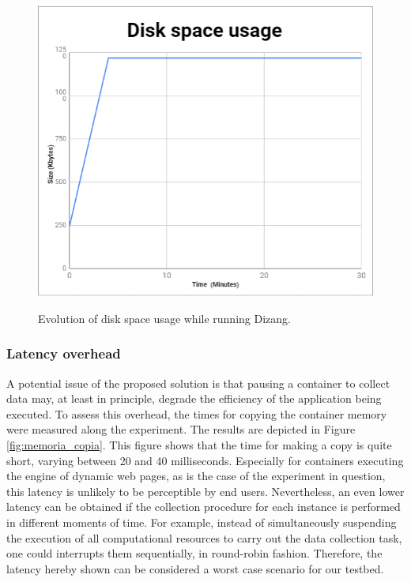 \documentclass[conference]{IEEEtran}
\newcommand{\fancyname}{Dizang}
\begin{document}
\begin{figure}[htb!]
\footnotesize
\caption{Evolution of disk space usage while running \fancyname.}
\includegraphics[scale=0.55]{evolucao_coleta_ieee.png}
\centering
\label{fig:evolucao_coleta}
\end{figure}


\subsubsection{Latency overhead}
A potential issue of the proposed solution is that pausing a container to collect data may, at least in principle, degrade the efficiency of the application being executed.
%
To assess this overhead, the times for copying the container memory were measured along the experiment.
%
The results are depicted in Figure \ref{fig:memoria_copia}.
%
This figure shows that the time for making a copy is quite short, varying between 20 and 40 milliseconds. 
%
Especially for containers executing the engine of dynamic web pages, as is the case of the experiment in question, this latency is unlikely to be perceptible by end users.
%
Nevertheless, an even lower latency can be obtained if the collection procedure for each instance is performed in different moments of time.
%
For example, instead of simultaneously suspending the execution of all computational resources to carry out the data collection task, one could interrupts them sequentially, in round-robin fashion.
%
Therefore, the latency hereby shown can be considered a worst case scenario for our testbed.
\end{document}
